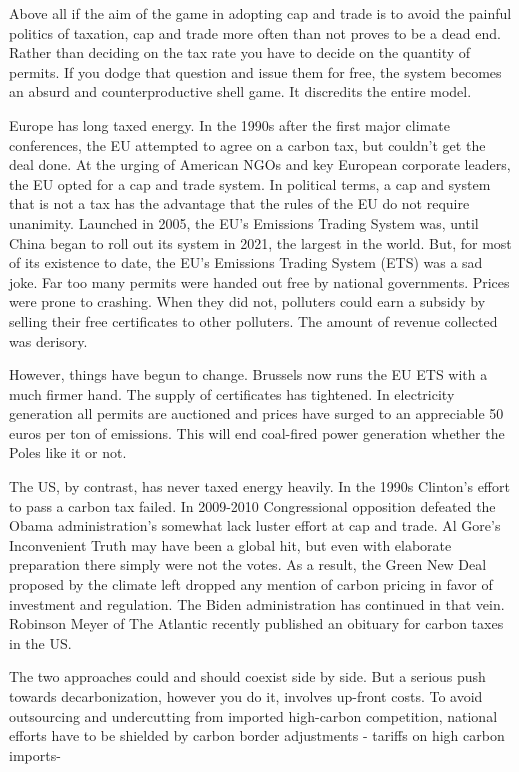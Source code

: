 \documentclass[
]{book}
\begin{document}
Above all if the aim of the game in adopting cap and trade is to avoid the painful politics of taxation, cap and trade more often than not proves to be a dead end. Rather than deciding on the tax rate you have to decide on the quantity of permits. If you dodge that question and issue them for free, the system becomes an absurd and counterproductive shell game. It discredits the entire model.

Europe has long taxed energy. In the 1990s after the first major climate conferences, the EU attempted to agree on a carbon tax, but couldn't get the deal done. At the urging of American NGOs and key European corporate leaders, the EU opted for a cap and trade system. In political terms, a cap and system that is not a tax has the advantage that the rules of the EU do not require unanimity. Launched in 2005, the EU's Emissions Trading System was, until China began to roll out its system in 2021, the largest in the world. But, for most of its existence to date, the EU's Emissions Trading System (ETS) was a sad joke. Far too many permits were handed out free by national governments. Prices were prone to crashing. When they did not, polluters could earn a subsidy by selling their free certificates to other polluters. The amount of revenue collected was derisory.

However, things have begun to change. Brussels now runs the EU ETS with a much firmer hand. The supply of certificates has tightened. In electricity generation all permits are auctioned and prices have surged to an appreciable 50 euros per ton of emissions. This will end coal-fired power generation whether the Poles like it or not.

The US, by contrast, has never taxed energy heavily. In the 1990s Clinton's effort to pass a carbon tax failed. In 2009-2010 Congressional opposition defeated the Obama administration's somewhat lack luster effort at cap and trade. Al Gore's Inconvenient Truth may have been a global hit, but even with elaborate preparation there simply were not the votes. As a result, the Green New Deal proposed by the climate left dropped any mention of carbon pricing in favor of investment and regulation. The Biden administration has continued in that vein. Robinson Meyer of The Atlantic recently published an obituary for carbon taxes in the US.

The two approaches could and should coexist side by side. But a serious push towards decarbonization, however you do it, involves up-front costs. To avoid outsourcing and undercutting from imported high-carbon competition, national efforts have to be shielded by carbon border adjustments - tariffs on high carbon imports-
\end{document}
